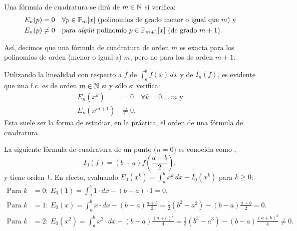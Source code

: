 \begin{definition}
  \label{def:2}
  Una fórmula de cuadratura se dirá de  $m\in\operatorname{{\mathbb N}}$ si
  verifica:
  \begin{align*}
    E_n(p)&=0 \quad \forall p\in\operatorname{{\mathbb P}}_m[x] \text{ (polinomios
      de grado menor o igual que $m$) y}
    \\
    E_n(p)&\neq 0 \quad \text{para \emph{algún} polinomio }
    p\in\operatorname{{\mathbb P}}_{m+1}[x] \text{ (de grado $m+1$)}.
  \end{align*}
\end{definition}
Así, decimos que una fórmula de cuadratura de orden $m$ es exacta para
los polinomios de orden (menor o igual a) $m$, pero no para los de
orden $m+1$.
\begin{remark}
  \label{rk:5}
  Utilizando la linealidad con respecto a $f$ de $\int_a^bf(x)\,dx$ y
  de $I_n(f)$, es evidente que una f.c. es de orden $m\in\operatorname{{\mathbb N}}$ si
  y sólo si verifica:
  \begin{align*}
    E_n(x^k)&=0 \quad \forall k=0\dots,m \text{ y}
    \\
    E_n(x^{m+1})&\neq 0.
  \end{align*}
  Esta suele ser la forma de estudiar, en la práctica, el orden de una
  fórmula de cuadratura.
\end{remark}

\begin{example}
  \label{ex:formula-punto-medio}
  La siguiente fórmula de cuadratura de un punto ($n=0$) es conocida
  como ,
  \begin{equation}
    \label{eq:f.c.-pto-medio}
    I_0(f)= (b-a) f\left(\frac{a+b}{2}\right),
  \end{equation}
  y tiene orden $1$. En efecto, evaluando $E_0(x^k)=\int_a^b
  x^k\, dx-I_0(x^k)$ para $k\ge 0$:
  \begin{align*}
   \text{Para } k&=0:\ E_0(1) = \int_a^b 1\cdot dx - (b-a)\cdot 1 = 0.
   \\
   \text{Para } k&=1:\ E_0(x) = \int_a^b x\cdot dx - (b-a)\frac{a+b}{2}
   = \frac{1}{2}(b^2-a^2) -  (b-a) \frac{a+b}{2} = 0.
   \\
   \text{Para } k&=2:\ E_0(x^2) = \int_a^b x^2\cdot dx 
   - (b-a) \frac{(a+b)^2}{4} 
   = \frac{1}{3}(b^3-a^3) - (b-a)\frac{(a+b)^2}{4} 
   \neq 0.
  \end{align*}
\end{example}

